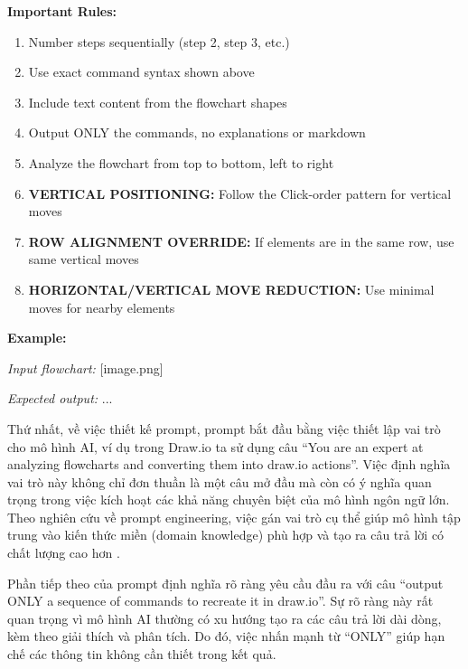 \documentclass[a4paper, 12pt]{report}
\begin{document}
{\begin{tcolorbox}[
    colback=gray!10,
    colframe=gray!50!black,
    title=Nội dung prompt,
    fonttitle=\bfseries,
    coltitle=white,
    colbacktitle=gray!50!black,
    before skip=5pt,
    after skip=5pt
]
\vspace{0.2cm}
\textbf{Important Rules:}
\begin{enumerate}[nosep, leftmargin=*]
    \item Number steps sequentially (step 2, step 3, etc.)
    \item Use exact command syntax shown above
    \item Include text content from the flowchart shapes
    \item Output ONLY the commands, no explanations or markdown
    \item Analyze the flowchart from top to bottom, left to right
    \item \textbf{VERTICAL POSITIONING:} Follow the Click-order pattern for vertical moves
    \item \textbf{ROW ALIGNMENT OVERRIDE:} If elements are in the same row, use same vertical moves
    \item \textbf{HORIZONTAL/VERTICAL MOVE REDUCTION:} Use minimal moves for nearby elements
\end{enumerate}

\vspace{0.2cm}
\textbf{Example:}

\noindent\textit{Input flowchart:} [image.png]

\noindent\textit{Expected output:} ...

\end{tcolorbox}








Thứ nhất, về việc thiết kế prompt, prompt bắt đầu bằng việc thiết lập vai trò cho mô hình AI, ví dụ trong Draw.io ta sử dụng câu ``You are an expert at analyzing flowcharts and converting them into draw.io actions''. Việc định nghĩa vai trò này không chỉ đơn thuần là một câu mở đầu mà còn có ý nghĩa quan trọng trong việc kích hoạt các khả năng chuyên biệt của mô hình ngôn ngữ lớn. Theo nghiên cứu về prompt engineering, việc gán vai trò cụ thể giúp mô hình tập trung vào kiến thức miền (domain knowledge) phù hợp và tạo ra câu trả lời có chất lượng cao hơn \cite{kong2024betterzeroshotreasoningroleplay}.


Phần tiếp theo của prompt định nghĩa rõ ràng yêu cầu đầu ra với câu ``output ONLY a sequence of commands to recreate it in draw.io''. Sự rõ ràng này rất quan trọng vì mô hình AI thường có xu hướng tạo ra các câu trả lời dài dòng, kèm theo giải thích và phân tích. Do đó, việc nhấn mạnh từ ``ONLY'' giúp hạn chế các thông tin không cần thiết trong kết quả.


}
\end{document}
